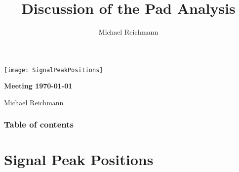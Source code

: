 \documentclass[9pt]{beamer}
\title[Analysis]{Discussion of the Pad Analysis}
\author[M. Reichmann]{Michael Reichmann}
\institute[\textbf{\textit{ETH}}\scalebox{.6}{\textit{Z\"{u}rich}}]{Swiss Federal Institute of Technology Zurich}
\begin{document}
\begin{frame}
	\begin{center}
		\texttt{[image: SignalPeakPositions]}
	\end{center}
	\begin{alertblock}{
		\begin{center}
			\textbf{Meeting \today}
		\end{center}}
		\vspace*{10pt}
		\begin{center}\small
		Michael Reichmann
		\end{center}\normalsize
	\end{alertblock}
\end{frame}
\begin{frame}[allowframebreaks]
	\frametitle{Table of contents}
	\tableofcontents   %
\end{frame}
\section{Signal Peak Positions}
\end{document}

